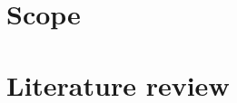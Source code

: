 \documentclass[12pt]{report}
\begin{document}
	\chapter{Scope}
	
	\chapter{Literature review}
	
	\chapter{}
	
	\chapter{}
	
	\chapter{}
	
	\chapter{}
	
	\chapter{}
	
	\chapter{}
	
	\chapter{}
	
	\renewcommand{\bibname}{References} %
	\setlength{\bibitemsep}{1cm}        %
	\cleardoublepage
	\uspunctuation
	\printbibliography
	
	
	
	
\end{document}
